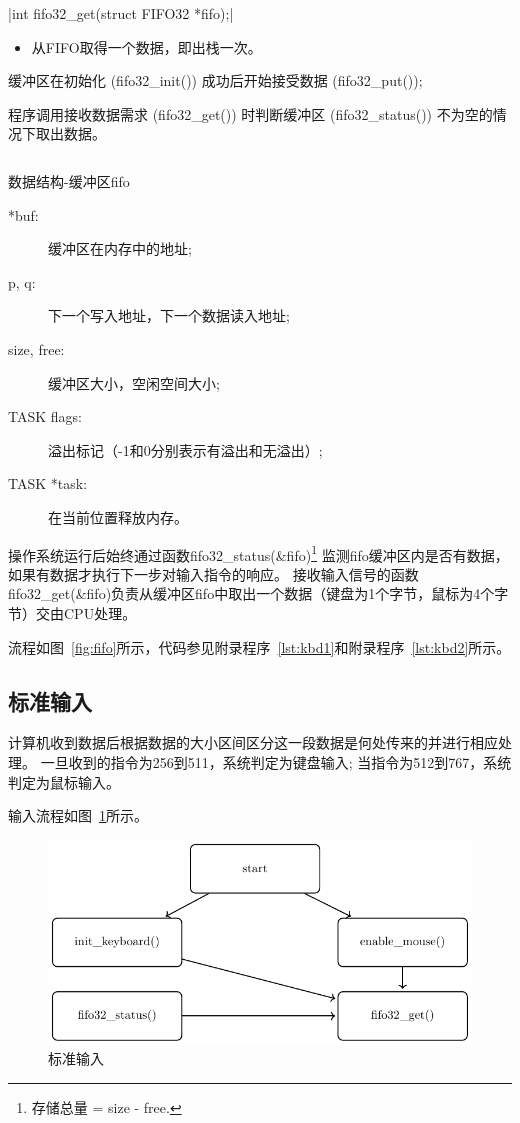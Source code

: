 \csingle|int fifo32_get(struct FIFO32 *fifo);|
\begin{itemize}
  \item 从FIFO取得一个数据，即出栈一次。\\
\end{itemize}

缓冲区在初始化 (fifo32\_init()) 成功后开始接受数据 (fifo32\_put());

程序调用接收数据需求 (fifo32\_get()) 时判断缓冲区 (fifo32\_status()) 不为空的情况下取出数据。
\begin{listing}[H]
  \inputminted[tabsize=2, firstline=40, lastline=44,
    linenos=true]{c}{../ZOS/src/kernel/bootpack.h}
  \caption{数据结构-缓冲区fifo}
  \label{lst:fifo}
\end{listing}
\begin{description}
\item[*buf:]缓冲区在内存中的地址;
\item[p, q:]下一个写入地址，下一个数据读入地址;
\item[size, free:]缓冲区大小，空闲空间大小;
\item[TASK flags:]溢出标记（-1和0分别表示有溢出和无溢出）;
\item[TASK *task:]在当前位置释放内存。
\end{description}

操作系统运行后始终通过函数fifo32\_status(\&fifo)\footnote{存储总量 = size - free.}
监测fifo缓冲区内是否有数据，如果有数据才执行下一步对输入指令的响应。
接收输入信号的函数fifo32\_get(\&fifo)负责从缓冲区fifo中取出一个数据（键盘为1个字节，鼠标为4个字节）交由CPU处理。

流程如图~\ref{fig:fifo}所示，代码参见附录程序~\ref{lst:kbd1}和附录程序~\ref{lst:kbd2}所示。


\subsection{标准输入}
计算机收到数据后根据数据的大小区间区分这一段数据是何处传来的并进行相应处理。
一旦收到的指令为256到511，系统判定为键盘输入;
当指令为512到767，系统判定为鼠标输入。

输入流程如图~\ref{fig:io}所示。
\begin{figure}
  \centering
  \includegraphics[width=.7\textwidth]{../Fig/func/io.pdf}
  \caption{标准输入}
  \label{fig:io}
\end{figure}


